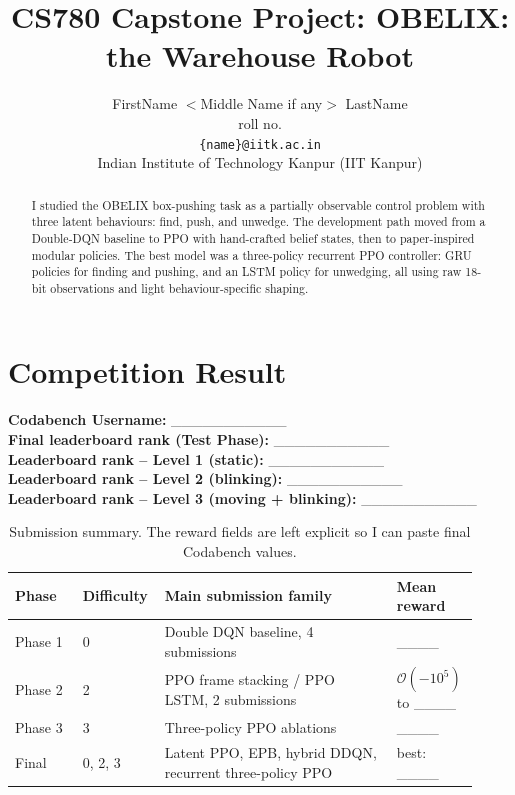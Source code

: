 \documentclass[11pt, oneside]{article}
\title{CS780 Capstone Project: OBELIX: the Warehouse Robot}
\author{
    FirstName $<$Middle Name if any$>$ LastName  \\
    roll no.\\
    {\tt \{name\}@iitk.ac.in}\\
    Indian Institute of Technology Kanpur (IIT Kanpur)
}
\date{}
\begin{document}
\maketitle

\begin{abstract}
I studied the OBELIX box-pushing task as a partially observable control problem with three latent behaviours: find, push, and unwedge. The development path moved from a Double-DQN baseline to PPO with hand-crafted belief states, then to paper-inspired modular policies. The best model was a three-policy recurrent PPO controller: GRU policies for finding and pushing, and an LSTM policy for unwedging, all using raw 18-bit observations and light behaviour-specific shaping.
\end{abstract}

\section{Competition Result}
\textbf{Codabench Username:} \_\_\_\_\_\_\_\_\_\_\_ \\
\textbf{Final leaderboard rank (Test Phase):} \_\_\_\_\_\_\_\_\_\_\_ \\
\textbf{Leaderboard rank -- Level 1 (static):} \_\_\_\_\_\_\_\_\_\_\_ \\
\textbf{Leaderboard rank -- Level 2 (blinking):} \_\_\_\_\_\_\_\_\_\_\_ \\
\textbf{Leaderboard rank -- Level 3 (moving + blinking):} \_\_\_\_\_\_\_\_\_\_\_

\begin{table}[H]
\centering
\caption{Submission summary. The reward fields are left explicit so I can paste final Codabench values.}
\begin{tabular}{p{0.14\linewidth}p{0.15\linewidth}p{0.48\linewidth}p{0.15\linewidth}}
\toprule
Phase & Difficulty & Main submission family & Mean reward \\
\midrule
Phase 1 & 0 & Double DQN baseline, 4 submissions & \_\_\_\_ \\
Phase 2 & 2 & PPO frame stacking / PPO LSTM, 2 submissions & $\mathcal{O}(-10^5)$ to \_\_\_\_ \\
Phase 3 & 3 & Three-policy PPO ablations & \_\_\_\_ \\
Final & 0, 2, 3 & Latent PPO, EPB, hybrid DDQN, recurrent three-policy PPO & best: \_\_\_\_ \\
\bottomrule
\end{tabular}
\end{table}
\end{document}
